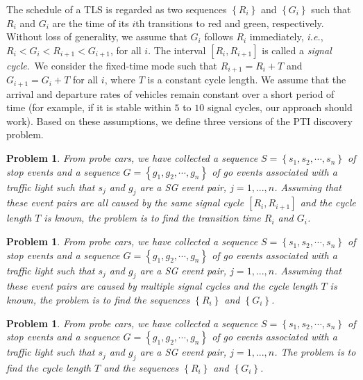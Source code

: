 \documentclass[final,oneside,onecolumn,12pt,a4paper]{book}%
\newtheorem{problem}[theorem]{Problem}
\begin{document}
The schedule of a TLS is regarded as two sequences $\left\{  R_{i}\right\}  $
and $\left\{  G_{i}\right\}  $ such that $R_{i}$ and $G_{i}$ are the time of
its $i$th transitions to red and green, respectively. Without loss of
generality, we assume that $G_{i}$ follows $R_{i}$ immediately, \textit{i.e.},
$R_{i}<G_{i}<R_{i+1}<G_{i+1}$, for all $i$. The interval $\left[
R_{i},R_{i+1}\right]  $ is called a \emph{signal cycle}.\ We consider the
fixed-time mode such that $R_{i+1}=R_{i}+T$ and $G_{i+1}=G_{i}+T$ for all $i$,
where $T$ is a constant cycle length. We assume that the arrival and departure
rates of vehicles remain constant over a short period of time (for example, if
it is stable within $5$ to $10$ signal cycles, our approach should work).
Based on these assumptions, we define three versions of the PTI discovery problem.

\begin{problem}
\label{prob:ver1}From probe cars, we have collected a sequence $S=\left\{
s_{1},s_{2},\cdots,s_{n}\right\}  $ of stop events and a sequence $G=\left\{
g_{1},g_{2},\cdots,g_{n}\right\}  $ of go events associated with a traffic
light such that $s_{j}$ and $g_{j}$ are a SG event pair, $j=1,...,n$. Assuming
that these event pairs are all caused by the same signal cycle $\left[
R_{i},R_{i+1}\right]  $ and the cycle length $T$ is known, the problem is to
find the transition time $R_{i}$ and $G_{i}$.
\end{problem}

\begin{problem}
\label{prob:ver2}From probe cars, we have collected a sequence $S=\left\{
s_{1},s_{2},\cdots,s_{n}\right\}  $ of stop events and a sequence $G=\left\{
g_{1},g_{2},\cdots,g_{n}\right\}  $ of go events associated with a traffic
light such that $s_{j}$ and $g_{j}$ are a SG event pair, $j=1,...,n$. Assuming
that these event pairs are caused by multiple signal cycles and the cycle
length $T$ is known, the problem is to find the sequences $\left\{
R_{i}\right\}  $ and $\left\{  G_{i}\right\}  $.
\end{problem}

\begin{problem}
\label{prob:ver3}From probe cars, we have collected a sequence $S=\left\{
s_{1},s_{2},\cdots,s_{n}\right\}  $ of stop events and a sequence $G=\left\{
g_{1},g_{2},\cdots,g_{n}\right\}  $ of go events associated with a traffic
light such that $s_{j}$ and $g_{j}$ are a SG event pair, $j=1,...,n$. The
problem is to find the cycle length $T$ and the sequences $\left\{
R_{i}\right\}  $ and $\left\{  G_{i}\right\}  $.
\end{problem}
\end{document}
